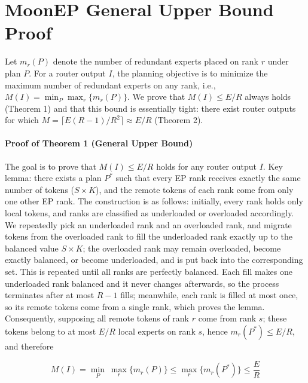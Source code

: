\section{MoonEP General Upper Bound Proof}
\label{app:moonep-proof}


 Let $m_r(P)$ denote the number of redundant experts placed on rank $r$ under
 plan $P$. For a router output $I$, the planning objective is to minimize the
 maximum number of redundant experts on any rank, i.e.,
 $M(I) = \min_P \max_r \{m_r(P)\}$. We prove that $M(I) \le E/R$ always holds
 (Theorem 1) and that this bound is essentially tight: there exist router
 outputs for which $M = \lceil E(R-1)/R^2 \rceil \approx E/R$ (Theorem 2).

\paragraph{Proof of Theorem 1 (General Upper Bound)} 
The goal is to prove that $M(I) \le E/R$ holds for any router output $I$. Key lemma: there exists a plan $P^*$ such that every EP rank receives exactly the same number of tokens ($S \times K$), and the remote tokens of each rank come from only one other EP rank. The construction is as follows: initially, every rank holds only local tokens, and ranks are classified as underloaded or overloaded accordingly. We repeatedly pick an underloaded rank and an overloaded rank, and migrate tokens from the overloaded rank to fill the underloaded rank exactly up to the balanced value $S \times K$; the overloaded rank may remain overloaded, become exactly balanced, or become underloaded, and is put back into the corresponding set. This is repeated until all ranks are perfectly balanced. Each fill makes one underloaded rank balanced and it never changes afterwards, so the process terminates after at most $R-1$ fills; meanwhile, each rank is filled at most once, so its remote tokens come from a single rank, which proves the lemma. Consequently, supposing all remote tokens of rank $r$ come from rank $s$; these tokens belong to at most $E/R$ local experts on rank $s$, hence $m_r(P^*) \le E/R$, and therefore

\begin{equation}
    M(I)=\min_{P}\ \max_{r}\big\{m_r(P)\big\} \le \max_{r}\big\{m_r(P^*)\big\} \le \frac{E}{R}
\end{equation}


